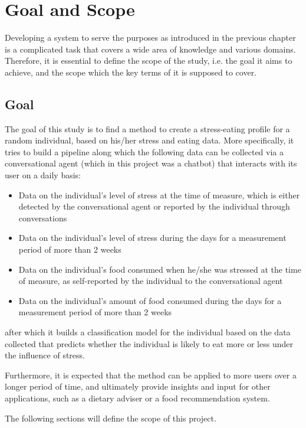 
\chapter{Goal and Scope}\label{chapter:goal_req}
Developing a system to serve the purposes as introduced in the previous chapter is a complicated task that covers a wide area of knowledge and various domains. Therefore, it is essential to define the scope of the study, i.e. the goal it aims to achieve, and the scope which the key terms of it is supposed to cover.

\section{Goal}
The goal of this study is to find a method to create a stress-eating profile for a random individual, based on his/her stress and eating data. More specifically, it tries to build a pipeline along which the following data can be collected via a conversational agent (which in this project was a chatbot) that interacts with its user on a daily basis:
\begin{itemize}
	\item Data on the individual’s level of stress at the time of measure, which is either detected by the conversational agent or reported by the individual through conversations
	\item Data on the individual’s level of stress during the days for a measurement period of more than 2 weeks
	\item Data on the individual’s food consumed when he/she was stressed at the time of measure, as self-reported by the individual to the conversational agent
	\item Data on the individual’s amount of food consumed during the days for a measurement period of more than 2 weeks
\end{itemize}
after which it builds a classification model for the individual based on the data collected that predicts whether the individual is likely to eat more or less under the influence of stress.

Furthermore, it is expected that the method can be applied to more users over a longer period of time, and ultimately provide insights and input for other applications, such as a dietary adviser or a food recommendation system.

The following sections will define the scope of this project.

